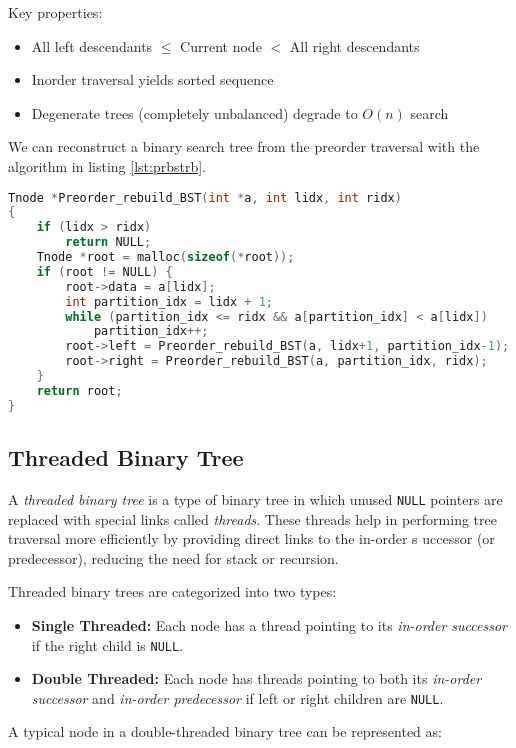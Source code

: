 Key properties:
\begin{itemize}
    \item All left descendants $\leq$ Current node $<$ All right descendants
    \item Inorder traversal yields sorted sequence
    \item Degenerate trees (completely unbalanced) degrade to $O(n)$ search
\end{itemize}

We can reconstruct a binary search tree from the preorder traversal with the
algorithm in listing \ref{lst:prbstrb}.

\begin{lstlisting}[language=C, label={lst:prbstrb}, caption=Reconstruct BST]
Tnode *Preorder_rebuild_BST(int *a, int lidx, int ridx)
{
    if (lidx > ridx)
        return NULL;
    Tnode *root = malloc(sizeof(*root));
    if (root != NULL) {
        root->data = a[lidx];
        int partition_idx = lidx + 1;
        while (partition_idx <= ridx && a[partition_idx] < a[lidx])
            partition_idx++;
        root->left = Preorder_rebuild_BST(a, lidx+1, partition_idx-1);
        root->right = Preorder_rebuild_BST(a, partition_idx, ridx);
    }
    return root;
}
\end{lstlisting}

\subsection{Threaded Binary Tree}
A \emph{threaded binary tree} is a type of binary tree in
which unused \texttt{NULL} pointers are replaced with special
links called \emph{threads}. These threads help in performing tree
traversal more efficiently by providing direct links to the in-order s
uccessor (or predecessor), reducing the need for stack or recursion.

Threaded binary trees are categorized into two types:

\begin{itemize}
    \item \textbf{Single Threaded:} Each node has a thread pointing to its \textit{in-order successor} if the right child is \texttt{NULL}.
    \item \textbf{Double Threaded:} Each node has threads pointing to both its \textit{in-order successor} and \textit{in-order predecessor} if left or right children are \texttt{NULL}.
\end{itemize}

A typical node in a double-threaded binary tree can be represented as:

